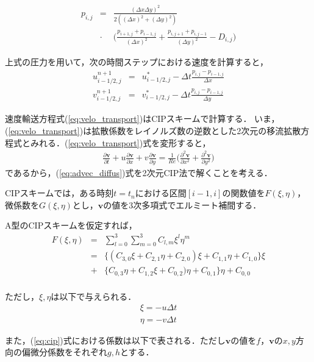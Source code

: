 \documentclass[twocolumn,oneside,a4paper]{article}
\begin{document}
\begin{eqnarray*}
	p_{i,j} &=& \frac{(\Delta x \Delta y)^2}{2((\Delta x)^2+(\Delta y)^2)} \\
	&\cdot& \bigg( \frac{p_{i+1,j}+p_{i-1,j}}{(\Delta x)^2} + \frac{p_{i,j+1}+p_{i,j-1}}{(\Delta y)^2} - D_{i,j}\bigg)
\end{eqnarray*}

上式の圧力を用いて，次の時間ステップにおける速度を計算すると，
\begin{eqnarray*}
	u^{n+1}_{i-1/2,j} &=& u^\ast_{i-1/2,j} - \Delta t \frac{p_{i,j}-p_{i-1,j}}{\Delta x} \\
	v^{n+1}_{i-1/2,j} &=& v^\ast_{i-1/2,j} - \Delta t \frac{p_{i,j}-p_{i-1,j}}{\Delta y} 
\end{eqnarray*}

速度輸送方程式(\ref{eq:velo_transport})はCIPスキームで計算する．
いま，(\ref{eq:velo_transport})は拡散係数をレイノルズ数の逆数とした2次元の移流拡散方程式とみれる．(\ref{eq:velo_transport})式を変形すると，
\begin{eqnarray}\label{eq:advec_diffus}
\frac{\partial \bm{v}}{\partial t} + u\frac{\partial \bm{v}}{\partial x} + v\frac{\partial \bm{v}}{\partial y} = \frac{1}{Re} \bigg( \frac{\partial^2 \bm{v}}{\partial x^2} + \frac{\partial^2 \bm{v}}{\partial y^2} \bigg)
\end{eqnarray}
であるから，(\ref{eq:advec_diffus})式を2次元CIP法で解くことを考える．

CIPスキームでは，ある時刻$t=t_n$における区間$[i-1,i]$の関数値を$F(\xi,\eta)$，微係数を$G(\xi,\eta)$とし，$\bm v$の値を3次多項式でエルミート補間する．

A型のCIPスキームを仮定すれば，
\begin{eqnarray}\label{eq:cip}
F(\xi,\eta) &=& \sum_{l=0}^3 \sum_{m=0}^3 C_{l,m} \xi^l \eta^m \nonumber\\
&=& \{ ( C_{3,0} \xi + C_{2,1}\eta + C_{2,0}) \xi + C_{1,1}\eta + C_{1,0} \} \xi \nonumber\\
 &+& \{C_{0,3}\eta + C_{1,2}\xi + C_{0,2})\eta + C_{0,1}\} \eta + C_{0,0} \nonumber\\
\end{eqnarray}

ただし，$\xi,\eta$は以下で与えられる．
\begin{eqnarray*}
\xi =  -u \Delta t\\
\eta = -v \Delta t
\end{eqnarray*}

また，(\ref{eq:cip})式における係数は以下で表される．ただし$\bm v$の値を$f$，$\bm{v}$の$x,y$方向の偏微分係数をそれぞれ$g,h$とする．
\end{document}

